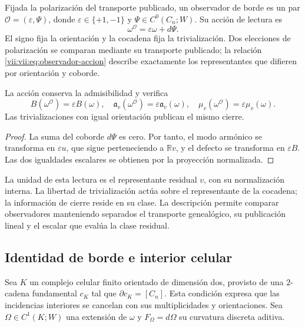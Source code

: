 \begin{definition}
\label{vii:vii:def:observador-borde}
Fijada la polarización del transporte publicado, un observador de borde
es un par \(\mathcal O=(\varepsilon,\Psi)\), donde
\(\varepsilon\in\{+1,-1\}\) y \(\Psi\in C^0(C_n;W)\).
Su acción de lectura es
\begin{equation}
 \omega^{\mathcal O}=\varepsilon\omega+d\Psi.
 \label{vii:vii:eq:observador-accion}
\end{equation}
El signo fija la orientación y la cocadena fija la trivialización.
Dos elecciones de polarización se comparan mediante su transporte
publicado; la relación \eqref{vii:vii:eq:observador-accion} describe
exactamente los representantes que difieren por orientación y coborde.
\end{definition}

\begin{proposition}
\label{vii:vii:prop:observador-covarianza}
La acción conserva la admisibilidad y verifica
\[
 B(\omega^{\mathcal O})=\varepsilon B(\omega),\quad
 \mathfrak a_v(\omega^{\mathcal O})=\varepsilon\mathfrak a_v(\omega),
 \quad \mu_v(\omega^{\mathcal O})=\varepsilon\mu_v(\omega).
\]
Las trivializaciones con igual orientación publican el mismo cierre.
\end{proposition}

\begin{proof}
La suma del coborde \(d\Psi\) es cero. Por tanto, el modo armónico
se transforma en \(\varepsilon u\), que sigue perteneciendo a
\(\mathbb Rv\), y el defecto se transforma en \(\varepsilon B\).
Las dos igualdades escalares se obtienen por la proyección normalizada.
\end{proof}

La unidad de esta lectura es el representante residual \(v\), con su
normalización interna. La libertad de trivialización actúa sobre el
representante de la cocadena; la información de cierre reside en su
clase. La descripción permite comparar observadores manteniendo
separados el transporte genealógico, su publicación lineal y el escalar
que evalúa la clase residual.

\subsection{Identidad de borde e interior celular}
\label{vii:vii:sec:observador-stokes}

Sea \(K\) un complejo celular finito orientado de dimensión dos,
provisto de una \(2\)-cadena fundamental \(c_K\) tal que
\(\partial c_K=[C_n]\). Esta condición expresa que las incidencias
interiores se cancelan con sus multiplicidades y orientaciones.
Sea \(\Omega\in C^1(K;W)\) una extensión de \(\omega\) y
\(F_\Omega=d\Omega\) su curvatura discreta aditiva.

